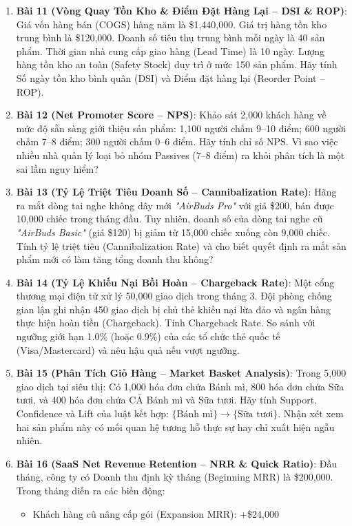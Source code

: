 \begin{baitapbox}
\begin{enumerate}
    \item \textbf{Bài 11 (Vòng Quay Tồn Kho \& Điểm Đặt Hàng Lại -- DSI \& ROP)}: Giá vốn hàng bán (COGS) hàng năm là \$1,440,000. Giá trị hàng tồn kho trung bình là \$120,000. Doanh số tiêu thụ trung bình mỗi ngày là 40 sản phẩm. Thời gian nhà cung cấp giao hàng (Lead Time) là 10 ngày. Lượng hàng tồn kho an toàn (Safety Stock) duy trì ở mức 150 sản phẩm. Hãy tính Số ngày tồn kho bình quân (DSI) và Điểm đặt hàng lại (Reorder Point -- ROP).
    \item \textbf{Bài 12 (Net Promoter Score -- NPS)}: Khảo sát 2,000 khách hàng về mức độ sẵn sàng giới thiệu sản phẩm: 1,100 người chấm 9--10 điểm; 600 người chấm 7--8 điểm; 300 người chấm 0--6 điểm. Hãy tính chỉ số NPS. Vì sao việc nhiều nhà quản lý loại bỏ nhóm Passives (7--8 điểm) ra khỏi phân tích là một sai lầm nguy hiểm?
    \item \textbf{Bài 13 (Tỷ Lệ Triệt Tiêu Doanh Số -- Cannibalization Rate)}: Hãng ra mắt dòng tai nghe không dây mới \textit{"AirBuds Pro"} với giá \$200, bán được 10,000 chiếc trong tháng đầu. Tuy nhiên, doanh số của dòng tai nghe cũ \textit{"AirBuds Basic"} (giá \$120) bị giảm từ 15,000 chiếc xuống còn 9,000 chiếc. Tính tỷ lệ triệt tiêu (Cannibalization Rate) và cho biết quyết định ra mắt sản phẩm mới có làm tăng tổng doanh thu không?
    \item \textbf{Bài 14 (Tỷ Lệ Khiếu Nại Bồi Hoàn -- Chargeback Rate)}: Một cổng thương mại điện tử xử lý 50,000 giao dịch trong tháng 3. Đội phòng chống gian lận ghi nhận 450 giao dịch bị chủ thẻ khiếu nại lừa đảo và ngân hàng thực hiện hoàn tiền (Chargeback). Tính Chargeback Rate. So sánh với ngưỡng giới hạn 1.0\% (hoặc 0.9\%) của các tổ chức thẻ quốc tế (Visa/Mastercard) và nêu hậu quả nếu vượt ngưỡng.
    \item \textbf{Bài 15 (Phân Tích Giỏ Hàng -- Market Basket Analysis)}: Trong 5,000 giao dịch tại siêu thị: Có 1,000 hóa đơn chứa Bánh mì, 800 hóa đơn chứa Sữa tươi, và 400 hóa đơn chứa CẢ Bánh mì và Sữa tươi. Hãy tính Support, Confidence và Lift của luật kết hợp: $\{ \text{Bánh mì} \} \rightarrow \{ \text{Sữa tươi} \}$. Nhận xét xem hai sản phẩm này có mối quan hệ tương hỗ thực sự hay chỉ xuất hiện ngẫu nhiên.
    \item \textbf{Bài 16 (SaaS Net Revenue Retention -- NRR \& Quick Ratio)}: Đầu tháng, công ty có Doanh thu định kỳ tháng (Beginning MRR) là \$200,000. Trong tháng diễn ra các biến động:
    \begin{itemize}
        \item Khách hàng cũ nâng cấp gói (Expansion MRR): +\$24,000

\end{itemize}
\end{enumerate}
\end{baitapbox}
